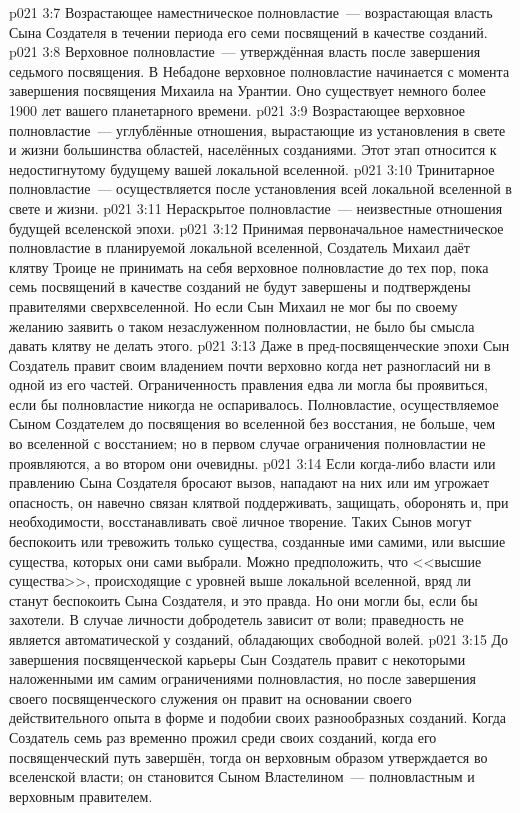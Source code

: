 \vs p021 3:7 Возрастающее наместническое полновластие~--- возрастающая власть Сына Создателя в течении периода его семи посвящений в качестве созданий.
\vs p021 3:8 Верховное полновластие~--- утверждённая власть после завершения седьмого посвящения. В Небадоне верховное полновластие начинается с момента завершения посвящения Михаила на Урантии. Оно существует немного более 1900 лет вашего планетарного времени.
\vs p021 3:9 Возрастающее верховное полновластие~--- углублённые отношения, вырастающие из установления в свете и жизни большинства областей, населённых созданиями. Этот этап относится к недостигнутому будущему вашей локальной вселенной.
\vs p021 3:10 Тринитарное полновластие~--- осуществляется после установления всей локальной вселенной в свете и жизни.
\vs p021 3:11 Нераскрытое полновластие~--- неизвестные отношения будущей вселенской эпохи.
\vs p021 3:12 \pc Принимая первоначальное наместническое полновластие в планируемой локальной вселенной, Создатель Михаил даёт клятву Троице не принимать на себя верховное полновластие до тех пор, пока семь посвящений в качестве созданий не будут завершены и подтверждены правителями сверхвселенной. Но если Сын Михаил не мог бы по своему желанию заявить о таком незаслуженном полновластии, не было бы смысла давать клятву не делать этого.
\vs p021 3:13 Даже в пред\hyp{}посвященческие эпохи Сын Создатель правит своим владением почти верховно когда нет разногласий ни в одной из его частей. Ограниченность правления едва ли могла бы проявиться, если бы полновластие никогда не оспаривалось. Полновластие, осуществляемое Сыном Создателем до посвящения во вселенной без восстания, не больше, чем во вселенной с восстанием; но в первом случае ограничения полновластии не проявляются, а во втором они очевидны.
\vs p021 3:14 Если когда\hyp{}либо власти или правлению Сына Создателя бросают вызов, нападают на них или им угрожает опасность, он навечно связан клятвой поддерживать, защищать, оборонять и, при необходимости, восстанавливать своё личное творение. Таких Сынов могут беспокоить или тревожить только существа, созданные ими самими, или высшие существа, которых они сами выбрали. Можно предположить, что <<высшие существа>>, происходящие с уровней выше локальной вселенной, вряд ли станут беспокоить Сына Создателя, и это правда. Но они могли бы, если бы захотели. В случае личности добродетель зависит от воли; праведность не является автоматической у созданий, обладающих свободной волей.
\vs p021 3:15 До завершения посвященческой карьеры Сын Создатель правит с некоторыми наложенными им самим ограничениями полновластия, но после завершения своего посвященческого служения он правит на основании своего действительного опыта в форме и подобии своих разнообразных созданий. Когда Создатель семь раз временно прожил среди своих созданий, когда его посвященческий путь завершён, тогда он верховным образом утверждается во вселенской власти; он становится Сыном Властелином~--- полновластным и верховным правителем.
